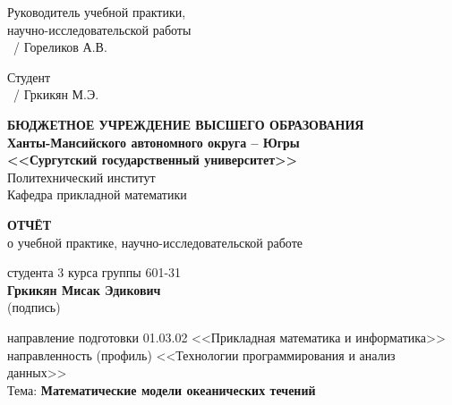 \documentclass[a4paper,14pt]{extarticle}
\begin{document}
\vfill

\noindent
\begin{minipage}[t]{0.45\textwidth}
    Руководитель учебной практики, \\
    научно-исследовательской работы \\
    \vspace{1cm}
    \hrulefill\ / Гореликов А.В.
\end{minipage}
\hfill
\begin{minipage}[t]{0.45\textwidth}
    Студент \\
    \vspace{1cm}
    \hrulefill\ / Гркикян М.Э.
\end{minipage}

\newpage


\begin{center}
    \textbf{БЮДЖЕТНОЕ УЧРЕЖДЕНИЕ ВЫСШЕГО ОБРАЗОВАНИЯ} \\
    \textbf{Ханты-Мансийского автономного округа -- Югры} \\
    \textbf{<<Сургутский государственный университет>>} \\
    \vspace{0.5cm}
    Политехнический институт \\
    Кафедра прикладной математики
\end{center}

\vspace{2cm}

\begin{center}
    \textbf{\Large ОТЧЁТ} \\
    о учебной практике, научно-исследовательской работе
\end{center}

\vspace{1.5cm}

\begin{center}
    студента 3 курса группы 601-31 \\
    \textbf{Гркикян Мисак Эдикович} \\
    \vspace{0.5cm}
    {\small (подпись)}
\end{center}

\vspace{1cm}

\begin{center}
    направление подготовки 01.03.02 <<Прикладная математика и информатика>> \\
    направленность (профиль) <<Технологии программирования и анализ данных>> \\
    \vspace{0.5cm}
    Тема: \textbf{Математические модели океанических течений}
\end{center}
\end{document}
